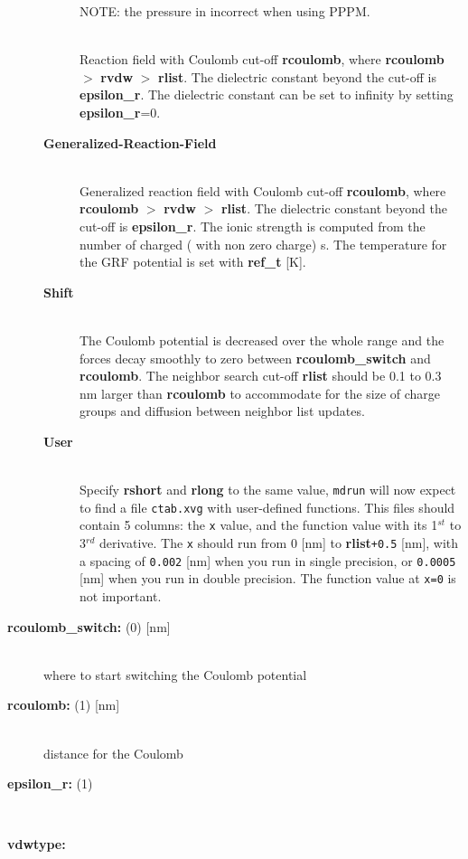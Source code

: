 \begin{description}
\begin{description}
NOTE: the pressure in incorrect when using PPPM.
\item[\normindex{Reaction-Field}]\mbox{}\\
Reaction field with Coulomb cut-off {\bf rcoulomb},
where {\bf rcoulomb} {\tt $>$} {\bf rvdw} {\tt $>$} {\bf rlist}.
The dielectric constant beyond the cut-off is {\bf epsilon\_r}.
The dielectric constant can be set to infinity by setting {\bf epsilon\_r}=0.
\item[{\bf Generalized-Reaction-Field}]\mbox{}\\
Generalized reaction field with Coulomb cut-off {\bf rcoulomb},
where {\bf rcoulomb} {\tt $>$} {\bf rvdw} {\tt $>$} {\bf rlist}.
The dielectric constant beyond the cut-off is {\bf epsilon\_r}.
The ionic strength is computed from the number of charged 
({\ie} with non zero charge) s.
The temperature for the GRF potential is set with 
{\bf ref\_t} [K].
\item[{\bf Shift}]\mbox{}\\
The Coulomb
potential is decreased over the whole range and the forces decay smoothly
to zero between {\bf rcoulomb\_switch} and {\bf rcoulomb}.
The neighbor search cut-off {\bf rlist} should be 0.1 to 0.3 nm larger than
{\bf rcoulomb} to accommodate for the size of charge groups and diffusion
between neighbor list updates.
\item[{\bf User}]\mbox{}\\
Specify {\bf rshort} and {\bf rlong} to the same value, {\tt mdrun}
will now expect to find a file {\tt ctab.xvg} with user-defined functions.
This files should contain 5 columns:
the {\tt x} value, and the function value with its 1$^{st}$
to 3$^{rd}$ derivative. The {\tt x} should run from 0 [nm] to
{\bf rlist}{\tt +0.5} [nm], with a spacing of {\tt 0.002}
[nm] when you run in single precision, or {\tt 0.0005} [nm] when
you run in double precision. The function value at {\tt x=0} is not
important.
\end{description}
\item[{\bf rcoulomb\_switch: }(0) {[nm]}]\mbox{}\\
where to start switching the Coulomb potential
\item[{\bf rcoulomb: }(1) {[nm]}]\mbox{}\\
distance for the Coulomb 
\item[{\bf epsilon\_r: }(1)]\mbox{}\\
\item[{\bf vdwtype:}]\mbox{}\\

\end{description}
